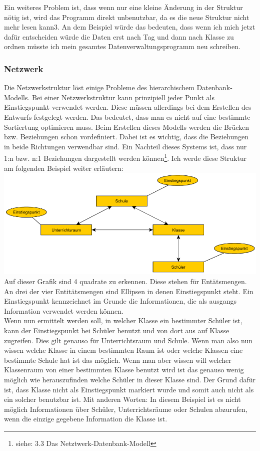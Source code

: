 \documentclass[a4paper, 12pt]{article}
\theoremstyle{plain}
\theoremstyle{definition}
\begin{document}
Ein weiteres Problem ist, dass wenn nur eine kleine Änderung in der Struktur nötig ist, wird das Programm direkt unbenutzbar, da es die neue Struktur nicht mehr lesen kann3. An dem Beispiel würde das bedeuten, dass wenn ich mich jetzt dafür entscheiden würde die Daten erst nach Tag und dann nach Klasse zu ordnen müsste ich mein gesamtes Datenverwaltungsprogramm neu schreiben. 
	
	\subsubsection{Netzwerk}
	\label{sec:netzdb}
	Die Netzwerkstruktur löst einige Probleme des hierarchischem Datenbank-Modells. Bei einer Netzwerkstruktur kann prinzipiell jeder Punkt als Einstiegspunkt verwendet werden. Diese müssen allerdings bei dem Erstellen des Entwurfs festgelegt werden. Das bedeutet, dass man es nicht auf eine bestimmte Sortiertung optimieren muss. Beim Erstellen dieses Modells werden die Brücken bzw. Beziehungen schon vordefiniert. Dabei ist es wichtig, dass die Beziehungen in beide Richtungen verwendbar sind. Ein Nachteil dieses Systems ist, dass nur 1:n bzw. n:1 Beziehungen dargestellt werden können\footnote{siehe: \cite{Jarosch2010} 3.3 Das Netztwerk-Datenbank-Modell}. Ich werde diese Struktur am folgenden Beispiel weiter erläutern: \\
\includegraphics[scale=1]{netzwerkmodell.pdf}	
Auf dieser Grafik sind 4 quadrate zu erkennen. Diese stehen für Entätsmengen. An drei der vier Entitätsmengen sind Ellipsen in denen Einstiegspunkt steht. Ein Einstiegspunkt kennzeichnet im Grunde die Informationen, die als ausgangs Information verwendet werden können. \\
Wenn nun ermittelt werden soll, in welcher Klasse ein bestimmter Schüler ist, kann der Einstiegspunkt bei Schüler benutzt und von dort aus auf Klasse zugreifen. Dies gilt genauso für Unterrichtsraum und Schule. Wenn man also nun wissen welche Klasse in einem bestimmten Raum ist oder welche Klassen eine bestimmte Schule hat ist das möglich. Wenn man aber wissen will welcher Klassenraum von einer bestimmten Klasse benutzt wird ist das genauso wenig möglich wie herauszufinden welche Schüler in dieser Klasse sind. Der Grund dafür ist, dass Klasse nicht als Einstiegspunkt markiert wurde und somit auch nicht als ein solcher benutzbar ist. Mit anderen Worten: In diesem Beispiel ist es nicht möglich Informationen über Schüler, Unterrichtsräume oder Schulen abzurufen, wenn die einzige gegebene Information die Klasse ist.
		
\end{document}

